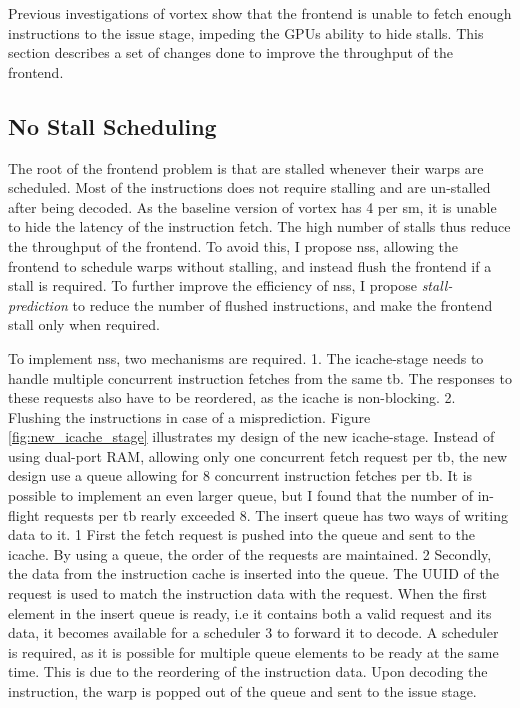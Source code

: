 Previous investigations of \Gls{vortex}\cite{Aurud_Project} show that the frontend is unable to fetch enough instructions to the issue stage, impeding the GPUs ability to hide stalls. This section describes a set of changes done to improve the throughput of the frontend.

\subsection{No Stall Scheduling} \label{sec:no_stall_scheduling}

The root of the frontend problem is that  are stalled whenever their warps are scheduled. Most of the instructions does not require stalling and are un-stalled after being decoded. As the baseline version of \Gls{vortex} has 4  per \acrshort{sm}, it is unable to hide the latency of the instruction fetch. The high number of stalls thus reduce the throughput of the frontend. To avoid this, I propose \acrfull{nss}, allowing the frontend to schedule warps without stalling, and instead flush the frontend if a stall is required. To further improve the efficiency of \acrshort{nss}, I propose \textit{stall-prediction} to reduce the number of flushed instructions, and make the frontend stall only when required.

To implement \acrshort{nss}, two mechanisms are required. 1. The icache-stage needs to handle multiple concurrent instruction fetches from the same \acrshort{tb}. The responses to these requests also have to be reordered, as the icache is non-blocking. 2. Flushing the instructions in case of a misprediction. Figure \ref{fig:new_icache_stage} illustrates my design of the new icache-stage. Instead of using dual-port RAM, allowing only one concurrent fetch request per \acrshort{tb}, the new design use a queue allowing for 8 concurrent instruction fetches per \acrshort{tb}. It is possible to implement an even larger queue, but I found that the number of in-flight requests per \acrshort{tb} rearly exceeded 8. The insert queue has two ways of writing data to it. \textcircled{\small{1}} First the fetch request is pushed into the queue and sent to the \acrshort{icache}. By using a queue, the order of the requests are maintained. \textcircled{\small{2}} Secondly, the data from the instruction cache is inserted into the queue. The UUID of the request is used to match the instruction data with the request. When the first element in the insert queue is ready, i.e it contains both a valid request and its data, it becomes available for a scheduler \textcircled{\small{3}} to forward it to decode. A scheduler is required, as it is possible for multiple queue elements to be ready at the same time. This is due to the reordering of the instruction data. Upon decoding the instruction, the warp is popped out of the queue and sent to the issue stage.

